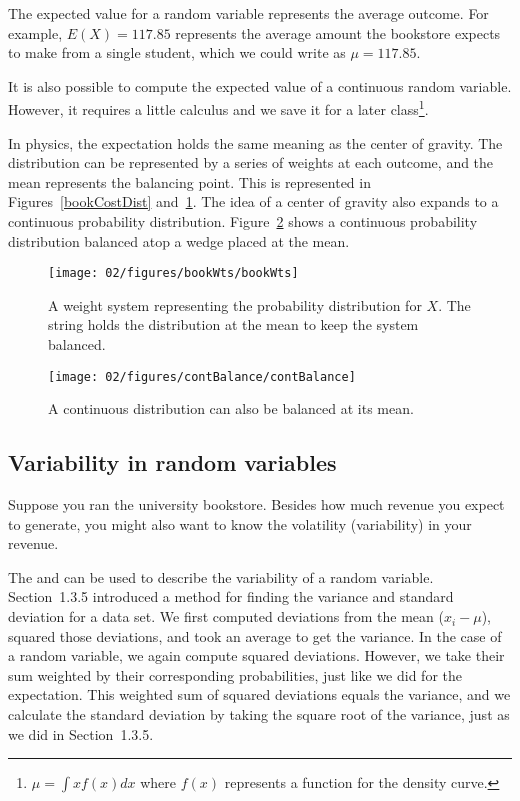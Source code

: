 The expected value for a random variable represents the average outcome. For example, $E(X)=117.85$ represents the average amount the bookstore expects to make from a single student, which we could write as $\mu=117.85$.

It is also possible to compute the expected value of a continuous random variable. However, it requires a little calculus and we save it for a later class\footnote{$\mu = \int xf(x)dx$ where $f(x)$ represents a function for the density curve.}.

In physics, the expectation holds the same meaning as the center of gravity. The distribution can be represented by a series of weights at each outcome, and the mean represents the balancing point. This is represented in Figures~\ref{bookCostDist} and~\ref{bookWts}. The idea of a center of gravity also expands to a continuous probability distribution. Figure~\ref{contBalance} shows a continuous probability distribution balanced atop a wedge placed at the mean.
\begin{figure}
\centering
\texttt{[image: 02/figures/bookWts/bookWts]}
\caption{A weight system representing the probability distribution for $X$. The string holds the distribution at the mean to keep the system balanced.}
\label{bookWts}
\end{figure}
\begin{figure}
\centering
\texttt{[image: 02/figures/contBalance/contBalance]}
\caption{A continuous distribution can also be balanced at its mean.}
\label{contBalance}
\end{figure}

\subsection{Variability in random variables}

Suppose you ran the university bookstore. Besides how much revenue you expect to generate, you might also want to know the volatility (variability) in your revenue. 

The  and  can be used to describe the variability of a random variable. Section~1.3.5 %
introduced a method for finding the variance and standard deviation for a data set. We first computed deviations from the mean ($x_i - \mu$), squared those deviations, and took an average to get the variance. In the case of a random variable, we again compute squared deviations. However, we take their sum weighted by their corresponding probabilities, just like we did for the expectation. This weighted sum of squared deviations equals the variance, and we calculate the standard deviation by taking the square root of the variance, just as we did in Section~1.3.5. %

